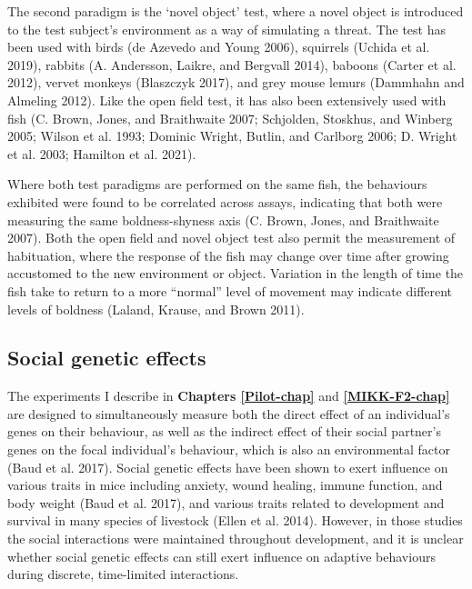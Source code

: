 \documentclass[
]{book}
\begin{document}
The second paradigm is the `novel object' test, where a novel object is introduced to the test subject's environment as a way of simulating a threat. The test has been used with birds (de Azevedo and Young 2006), squirrels (Uchida et al. 2019), rabbits (A. Andersson, Laikre, and Bergvall 2014), baboons (Carter et al. 2012), vervet monkeys (Blaszczyk 2017), and grey mouse lemurs (Dammhahn and Almeling 2012). Like the open field test, it has also been extensively used with fish (C. Brown, Jones, and Braithwaite 2007; Schjolden, Stoskhus, and Winberg 2005; Wilson et al. 1993; Dominic Wright, Butlin, and Carlborg 2006; D. Wright et al. 2003; Hamilton et al. 2021).

Where both test paradigms are performed on the same fish, the behaviours exhibited were found to be correlated across assays, indicating that both were measuring the same boldness-shyness axis (C. Brown, Jones, and Braithwaite 2007). Both the open field and novel object test also permit the measurement of habituation, where the response of the fish may change over time after growing accustomed to the new environment or object. Variation in the length of time the fish take to return to a more ``normal'' level of movement may indicate different levels of boldness (Laland, Krause, and Brown 2011).

\hypertarget{SGE}{%
\subsection{Social genetic effects}\label{SGE}}

The experiments I describe in \textbf{Chapters \ref{Pilot-chap}} and \textbf{\ref{MIKK-F2-chap}} are designed to simultaneously measure both the direct effect of an individual's genes on their behaviour, as well as the indirect effect of their social partner's genes on the focal individual's behaviour, which is also an environmental factor (Baud et al. 2017). Social genetic effects have been shown to exert influence on various traits in mice including anxiety, wound healing, immune function, and body weight (Baud et al. 2017), and various traits related to development and survival in many species of livestock (Ellen et al. 2014). However, in those studies the social interactions were maintained throughout development, and it is unclear whether social genetic effects can still exert influence on adaptive behaviours during discrete, time-limited interactions.
\end{document}
